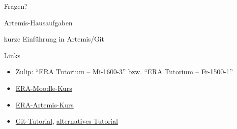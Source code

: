 \documentclass[
  german,            %
  aspectratio=169,    %
]{tumbeamer}
\begin{document}
\begin{frame}[c]{}{}
  \begin{center}
    \LARGE Fragen?
  \end{center}
\end{frame}

\begin{frame}[c]{Artemis-Hausaufgaben}{}
  \begin{center}
  	\LARGE kurze Einführung in Artemis/Git
  \end{center}
\end{frame}

\begin{frame}[fragile, c]{Links}{}
  \begin{itemize}
    \item Zulip: \href{https://zulip.in.tum.de/#narrow/channel/3255-ERA-Tutorium-.E2.80.93-Mi-1600-3}{\enquote{ERA Tutorium -- Mi-1600-3}}
          bzw. \href{https://zulip.in.tum.de/#narrow/channel/3264-ERA-Tutorium-.E2.80.93-Fr-1500-1}{\enquote{ERA Tutorium -- Fr-1500-1}}
    \item \href{https://www.moodle.tum.de/course/view.php?id=111440}{ERA-Moodle-Kurs}
    \item \href{https://artemis.in.tum.de/courses/516}{ERA-Artemis-Kurs}
    \item \href{https://git-scm.com/docs/gittutorial}{Git-Tutorial}, \href{https://rogerdudler.github.io/git-guide/}{alternatives Tutorial}
  \end{itemize}
\end{frame}

\maketitle
\end{document}
